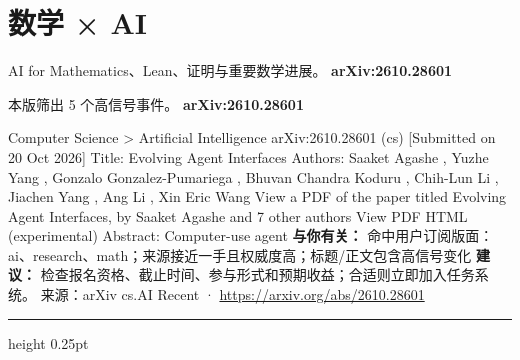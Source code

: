 \documentclass[10.5pt]{ctexart}
\begin{document}
\section*{数学 × AI}
{\color{ormuted} AI for Mathematics、Lean、证明与重要数学进展。}
\vspace{2mm}
{\LARGE\bfseries arXiv:2610.28601}\par
\vspace{1mm}
{\color{ormuted} 本版筛出 5 个高信号事件。}
\vspace{3mm}
{\Large\bfseries arXiv:2610.28601}\par
Computer Science > Artificial Intelligence arXiv:2610.28601 (cs) [Submitted on 20 Oct 2026] Title: Evolving Agent Interfaces Authors: Saaket Agashe , Yuzhe Yang , Gonzalo Gonzalez-Pumariega , Bhuvan Chandra Koduru , Chih-Lun Li , Jiachen Yang , Ang Li , Xin Eric Wang View a PDF of the paper titled Evolving Agent Interfaces, by Saaket Agashe and 7 other authors View PDF HTML (experimental) Abstract: Computer-use agent
\textbf{与你有关：} 命中用户订阅版面：ai、research、math；来源接近一手且权威度高；标题/正文包含高信号变化
\textbf{建议：} 检查报名资格、截止时间、参与形式和预期收益；合适则立即加入任务系统。
{\footnotesize\color{ormuted} 来源：arXiv cs.AI Recent · \url{https://arxiv.org/abs/2610.28601}}
\vspace{4mm}
\hrule height 0.25pt
\vspace{3mm}
\end{document}
